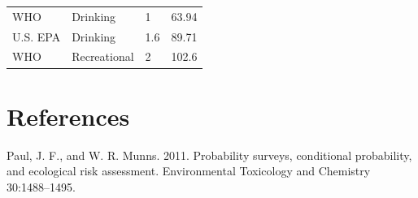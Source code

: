 \documentclass[11pt,]{article}
\begin{document}
\begin{longtable}[c]{@{}llll@{}}
\begin{minipage}[t]{0.11\columnwidth}\raggedright\strut
WHO
\strut\end{minipage} &
\begin{minipage}[t]{0.16\columnwidth}\raggedright\strut
Drinking
\strut\end{minipage} &
\begin{minipage}[t]{0.17\columnwidth}\raggedright\strut
1
\strut\end{minipage} &
\begin{minipage}[t]{0.17\columnwidth}\raggedright\strut
63.94
\strut\end{minipage}\tabularnewline
\begin{minipage}[t]{0.11\columnwidth}\raggedright\strut
U.S. EPA
\strut\end{minipage} &
\begin{minipage}[t]{0.16\columnwidth}\raggedright\strut
Drinking
\strut\end{minipage} &
\begin{minipage}[t]{0.17\columnwidth}\raggedright\strut
1.6
\strut\end{minipage} &
\begin{minipage}[t]{0.17\columnwidth}\raggedright\strut
89.71
\strut\end{minipage}\tabularnewline
\begin{minipage}[t]{0.11\columnwidth}\raggedright\strut
WHO
\strut\end{minipage} &
\begin{minipage}[t]{0.16\columnwidth}\raggedright\strut
Recreational
\strut\end{minipage} &
\begin{minipage}[t]{0.17\columnwidth}\raggedright\strut
2
\strut\end{minipage} &
\begin{minipage}[t]{0.17\columnwidth}\raggedright\strut
102.6
\strut\end{minipage}\tabularnewline
\bottomrule
\end{longtable}

\section*{References}\label{references}

Paul, J. F., and W. R. Munns. 2011. Probability surveys, conditional
probability, and ecological risk assessment. Environmental Toxicology
and Chemistry 30:1488--1495.
\end{document}
